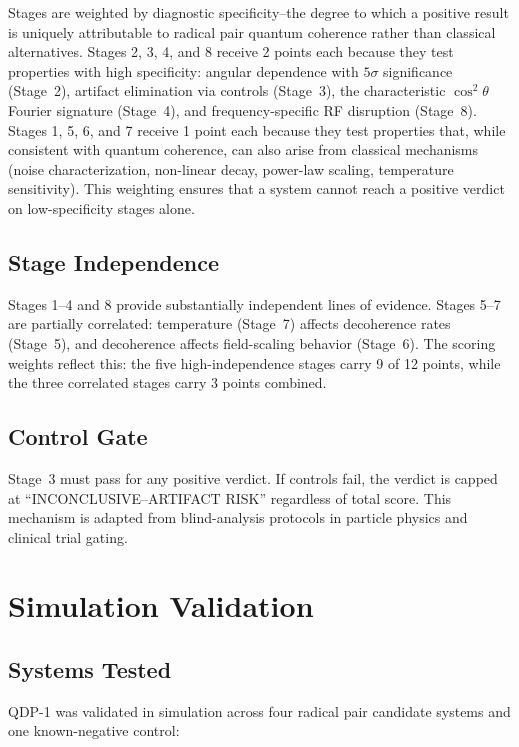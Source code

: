 \documentclass[preprint,amsmath,amssymb]{revtex4-2}
\begin{document}
Stages are weighted by diagnostic specificity--the degree to which a positive result is uniquely attributable to radical pair quantum coherence rather than classical alternatives. Stages 2, 3, 4, and 8 receive 2 points each because they test properties with high specificity: angular dependence with $5\sigma$ significance (Stage~2), artifact elimination via controls (Stage~3), the characteristic $\cos^2\theta$ Fourier signature (Stage~4), and frequency-specific RF disruption (Stage~8). Stages 1, 5, 6, and 7 receive 1 point each because they test properties that, while consistent with quantum coherence, can also arise from classical mechanisms (noise characterization, non-linear decay, power-law scaling, temperature sensitivity). This weighting ensures that a system cannot reach a positive verdict on low-specificity stages alone.

\subsection{Stage Independence}

Stages 1--4 and 8 provide substantially independent lines of evidence. Stages 5--7 are partially correlated: temperature (Stage~7) affects decoherence rates (Stage~5), and decoherence affects field-scaling behavior (Stage~6). The scoring weights reflect this: the five high-independence stages carry 9 of 12 points, while the three correlated stages carry 3 points combined.

\subsection{Control Gate}

Stage~3 must pass for any positive verdict. If controls fail, the verdict is capped at ``INCONCLUSIVE--ARTIFACT RISK'' regardless of total score. This mechanism is adapted from blind-analysis protocols in particle physics and clinical trial gating.

\section{Simulation Validation}

\subsection{Systems Tested}

QDP-1 was validated in simulation across four radical pair candidate systems and one known-negative control:
\end{document}
